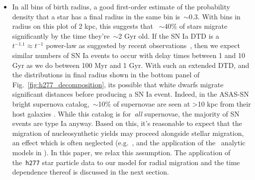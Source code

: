 \documentclass[fleqn, usenatbib]{mnras}
\begin{document}
\begin{itemize}
\begin{itemize}
		\item In all bins of birth radius, a good first-order estimate of the 
		probability density that a star has a final radius in the same bin 
		is~$\sim$0.3. With bins in radius on this plot of 2 kpc, this suggests 
		that ~$\sim$40\% of stars migrate significantly by the time 
		they're~$\sim$2 Gyr old. If the SN Ia DTD is a 
		$t^{-1.1} \approx t^{-1}$ power-law as suggested by recent 
		observations~\citep[e.g.][]{Maoz2012, Maoz2017}, 
		then we expect similar numbers of SN Ia events to occur with delay 
		times between 1 and 10 Gyr as we do between 100 Myr and 1 Gyr. With 
		such an extended DTD, and the distributions in final radius shown in 
		the bottom panel of Fig.~\ref{fig:h277_decomposition}, its possible 
		that white dwarfs migrate significant distances before producing a SN 
		Ia event. Indeed, in the ASAS-SN bright supernova catalog,~$\sim$10\% 
		of supernovae are seen at >10 kpc from their host galaxies 
		\citep{Holoien2019}. While this catalog is for~\textit{all} 
		supernovae, the majority of SN events are type Ia anyway. Based on 
		this, it's reasonable to expect that the migration 
		of nucleosynthetic yields may proceed alongside stellar migration, an 
		effect which is often neglected (e.g.~\citealp{Minchev2013}, and the 
		application of the~\citealp{Weinberg2017} analytic models in 
		\citealp{Feuillet2018}). In this paper, we relax this assumption. The 
		application of the~\texttt{h277} star particle data to our model for 
		radial migration and the time dependence thereof is discussed in the 
		next section. 

	\end{itemize} 

\end{itemize} 
\end{document}

